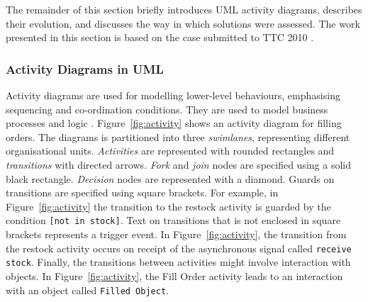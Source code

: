 The remainder of this section briefly introduces UML activity diagrams, describes their evolution, and discusses the way in which solutions were assessed. The work presented in this section is based on the case submitted to TTC 2010 \cite{rose10ttc_case}. 

\subsubsection{Activity Diagrams in UML}
Activity diagrams are used for modelling lower-level behaviours, emphasising sequencing and co-ordination conditions. They are used to model business processes and logic \cite{uml22}. Figure~\ref{fig:activity} shows an activity diagram for filling orders. The diagrams is partitioned into three \emph{swimlanes}, representing different organisational units. \emph{Activities} are represented with rounded rectangles and \emph{transitions} with directed arrows. \emph{Fork} and \emph{join} nodes are specified using a solid black rectangle. \emph{Decision} nodes are represented with a diamond. Guards on transitions are specified using square brackets. For example, in Figure~\ref{fig:activity} the transition to the restock activity is guarded by the condition \texttt{[not in stock]}. Text on transitions that is not enclosed in square brackets represents a trigger event. In Figure~\ref{fig:activity}, the transition from the restock activity occurs on receipt of the asynchronous signal called \texttt{receive stock}. Finally, the transitions between activities might involve interaction with objects. In Figure~\ref{fig:activity}, the Fill Order activity leads to an interaction with an object called \texttt{Filled Object}. 

